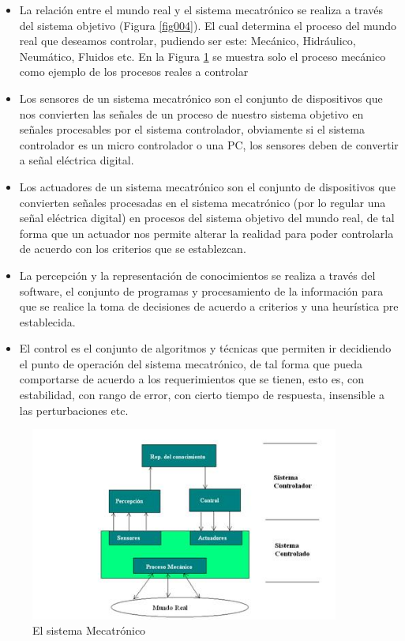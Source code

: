 \documentclass[12pt]{book}
\theoremstyle{definition}
\theoremstyle{remark}
\theoremstyle{plain}
\begin{document}
\begin{itemize}
\item 	La relación entre el mundo real y el sistema mecatrónico se realiza a través del sistema objetivo (Figura \ref{fig004}). El cual determina el proceso del mundo real que deseamos controlar, pudiendo ser este: Mecánico, Hidráulico, Neumático, Fluidos etc. En la Figura \ref{fig005} se muestra solo el proceso mecánico como ejemplo de los procesos reales a controlar
\item Los sensores de un sistema mecatrónico son el conjunto de dispositivos que nos convierten las señales de un proceso de nuestro sistema objetivo en señales procesables por el sistema controlador, obviamente si el sistema controlador es un micro controlador o una PC, los sensores deben de convertir a señal eléctrica digital.
\item Los actuadores de un sistema mecatrónico son el conjunto de dispositivos que convierten señales procesadas en el sistema mecatrónico (por lo regular una señal eléctrica digital) en procesos del sistema objetivo del mundo real, de tal forma que un actuador nos permite alterar la realidad para poder controlarla de acuerdo con los criterios que se establezcan.
\item La percepción y la representación de conocimientos se realiza a través del software, el conjunto de programas y procesamiento de la información para que se realice la toma de decisiones de acuerdo a criterios y una heurística pre establecida.
\item El control es el conjunto de algoritmos y técnicas que permiten ir decidiendo el punto de operación del sistema mecatrónico, de tal forma que pueda comportarse de acuerdo a los requerimientos que se tienen, esto es, con estabilidad, con rango de error, con cierto tiempo de respuesta, insensible a las perturbaciones etc.
\end{itemize}

\begin{figure}
\centering
\includegraphics[width=4in]{sistemamecatronico2.jpg}
\caption{El sistema Mecatrónico}
\label{fig005}
\end{figure}
\end{document}
